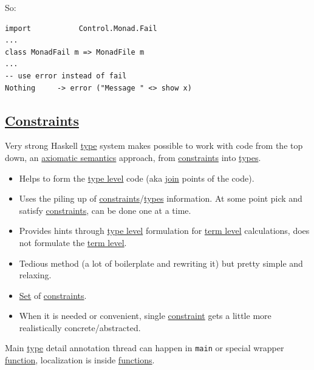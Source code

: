 \documentclass[11pt]{article}
\begin{document}
So:\\
\begin{verbatim}
import           Control.Monad.Fail
...
class MonadFail m => MonadFile m
...
-- use error instead of fail
Nothing     -> error ("Message " <> show x)
\end{verbatim}

\subsection{\hyperref[orgcddf7a9]{Constraints}}
\label{sec:org76794ad}

Very strong Haskell \hyperref[orgc4aea2f]{type} system makes possible to work with code from the top down, an \hyperref[org2c89d0c]{axiomatic semantics} approach, from \hyperref[orgcddf7a9]{constraints} into \hyperref[org4209edd]{types}.\\

\begin{itemize}
\item Helps to form the \hyperref[orgfe4cf3f]{type level} code (aka \hyperref[org949a0df]{join} points of the code).\\
\item Uses the piling up of \hyperref[orgcddf7a9]{constraints}/\hyperref[org4209edd]{types} information. At some point pick and satisfy \hyperref[orgcddf7a9]{constraints}, can be done one at a time.\\
\item Provides hints through \hyperref[orgfe4cf3f]{type level} formulation for \hyperref[org4d02774]{term level} calculations, does not formulate the \hyperref[org4d02774]{term level}.\\
\item Tedious method (a lot of boilerplate and rewriting it) but pretty simple and relaxing.\\

\item \hyperref[org1faf06d]{Set} of \hyperref[orgcddf7a9]{constraints}.\\

\item When it is needed or convenient, single \hyperref[org180980d]{constraint} gets a little more realistically concrete/abstracted.\\
\end{itemize}

Main \hyperref[orgc4aea2f]{type} detail annotation thread can happen in \texttt{main} or special wrapper \hyperref[orge15bc14]{function}, localization is inside \hyperref[orgaa8fb87]{functions}.\\
\end{document}
